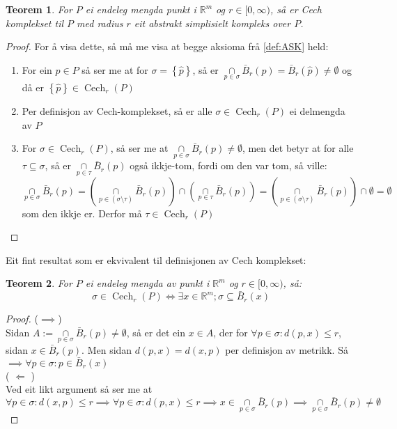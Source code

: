 \documentclass[a4paper, titlepage, 12pt, norsk]{article}
\theoremstyle{plain}
\newtheorem{theorem}{Teorem}[section]
\theoremstyle{definition}
\newcommand{\Rb}{\mathbb{R}}
\DeclareMathOperator{\Cech}{Cech}
\newcommand{\intersect}{ \mathop{\cap}\limits } %
\newcommand{\set}[1]{ \left \{ #1 \right \} } %
\begin{document}
\begin{theroem}
\begin{theorem} \label{thm:CASK}
	For $P$ ei endeleg mengda punkt i $\Rb^m$ og $r\in[0,\infty)$, så er Cech komplekset til $P$ med radius $r$ eit abstrakt simplisielt kompleks over $P$.
\end{theorem}

\begin{proof}
	For å visa dette, så må me visa at begge aksioma frå \autoref{def:ASK} held:
	\begin{enumerate}
		\item{ For ein \( \hat{p} \in P \) så ser me at for \( \sigma = \set{\hat{p}} \), så er \( \intersect_{p\in\sigma}\bar{B}_r(p)=\bar{B}_r(\hat{p})\neq\emptyset \) og då er \( \set{\hat{p}} \in \Cech_r(P) \) }
		\item{ Per definisjon av Cech-komplekset, så er alle \( \sigma \in \Cech_r(P) \) ei delmengda av \( P \) }
		\item{ For \( \sigma \in \Cech_r(P) \), så ser me at \( \intersect_{p\in\sigma} \bar{B}_r(p) \neq \emptyset \), men det betyr at for alle \( \tau \subseteq \sigma \), så er \( \intersect_{p\in\tau} \bar{B}_r(p) \) også ikkje-tom, fordi om den var tom, så ville: 
			\[ 
				\intersect_{p\in\sigma} \bar{B}_r(p) = \left( \intersect_{p\in(\sigma\setminus\tau)} \bar{B}_r(p) \right) \intersect \left( \intersect_{p\in\tau} \bar{B}_r(p) \right) = \left( \intersect_{p\in(\sigma\setminus\tau)} \bar{B}_r(p) \right) \intersect \emptyset = \emptyset 
			\] 
			som den ikkje er. Derfor må \( \tau \in \Cech_r(P) \) }
	\end{enumerate}
\end{proof}

Eit fint resultat som er ekvivalent til definisjonen av Cech komplekset:

\begin{theorem}
	For $P$ ei endeleg mengda av punkt i $\Rb^m$ og $r\in[0, \infty)$, så:
	\begin{equation*}
		\sigma\in \Cech_r(P) \Longleftrightarrow \exists x\in\Rb^m; \sigma \subseteq \bar{B}_r(x)
	\end{equation*}
\end{theorem}

\begin{proof}
	($\implies$)
	\\Sidan $A:=\intersect_{p\in\sigma}\bar{B}_r(p)\neq\emptyset$, så er det ein $x\in A$, der for $\forall p\in\sigma: d(p,x)\leq r$, sidan $x\in\bar{B}_r(p)$.
	Men sidan $d(p,x)=d(x,p)$ per definisjon av metrikk. 
	Så $\implies \forall p\in\sigma: p \in \bar{B}_r(x)$
	\\( \( \Longleftarrow \) )
	\\Ved eit likt argument så ser me at  $\forall p \in \sigma : d(x, p) \leq r \implies \forall p \in \sigma : d(p, x) \leq r \implies x \in \intersect_{p \in \sigma} \bar{B}_r(p) \implies \intersect_{p \in \sigma} \bar{B}_r(p) \neq \emptyset$
\end{proof}


\end{theroem}
\end{document}
